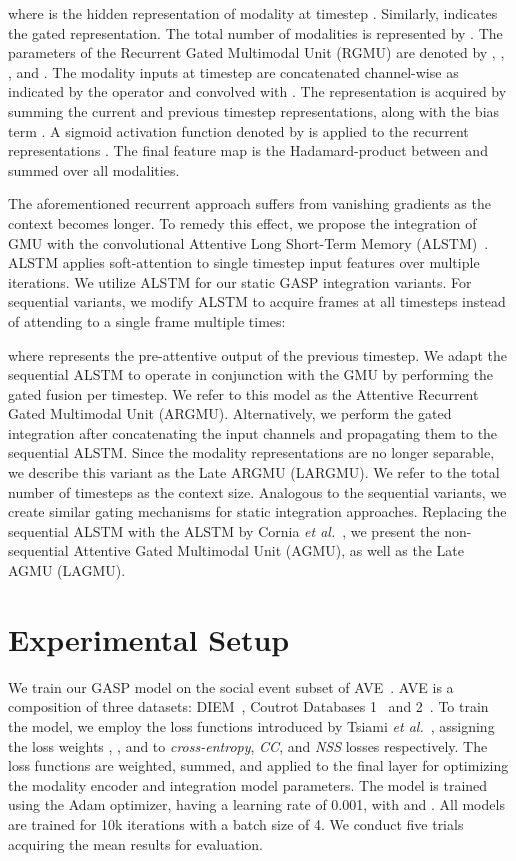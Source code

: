 \documentclass{article}
\begin{document}
where  is the hidden representation of modality  at timestep . Similarly,  indicates the gated representation. The total number of modalities is represented by . The parameters of the Recurrent Gated Multimodal Unit (RGMU) are denoted by , , , and . The modality inputs  at timestep  are concatenated channel-wise as indicated by the  operator and convolved with . The  representation is acquired by summing the current and previous timestep representations, along with the bias term . A sigmoid activation function denoted by  is applied to the recurrent representations . The final feature map  is the Hadamard-product between  and  summed over all modalities. 

The aforementioned recurrent approach suffers from vanishing gradients as the context becomes longer. To remedy this effect, we propose the integration of GMU with the convolutional Attentive Long Short-Term Memory (ALSTM)~\cite{cornia2018predicting}. 
ALSTM applies soft-attention to single timestep input features over multiple iterations.
We utilize ALSTM for our static GASP integration variants. For sequential variants, we  modify ALSTM to acquire frames at all timesteps instead of attending to a single frame multiple times:

where  represents the pre-attentive output of the previous timestep. We adapt the sequential ALSTM to operate in conjunction with the GMU by performing the gated fusion per timestep. We refer to this model as the Attentive Recurrent Gated Multimodal Unit (ARGMU). Alternatively, we perform the gated integration after concatenating the input channels and propagating them to the sequential ALSTM. Since the modality representations are no longer separable, we describe this variant as the Late ARGMU (LARGMU). We refer to the total number of timesteps as the context size. Analogous to the sequential variants, we create similar gating mechanisms for static integration approaches. Replacing the sequential ALSTM with the ALSTM by Cornia \textit{et al.}~, we present the non-sequential Attentive Gated Multimodal Unit (AGMU), as well as the Late AGMU (LAGMU).

\section{Experimental Setup}
\label{sec:exp}

We train our GASP model on the social event subset of AVE~\cite{tavakoli2020deep}. AVE is a composition of three datasets: DIEM~\cite{mital2011clustering}, Coutrot Databases 1~\cite{coutrot2014audiovisual} and 2~\cite{coutrot2015efficient}.
To train the model, we employ the loss functions introduced by Tsiami \textit{et al.}~, assigning the loss weights , , and  to \textit{cross-entropy}, \textit{CC}, and \textit{NSS} losses respectively. The loss functions  are weighted, summed, and applied to the final layer for optimizing the modality encoder and integration model parameters. 
The model is trained using the Adam optimizer, having a learning rate of 0.001, with  and . 
All models are trained for 10k iterations with a batch size of 4. We conduct five trials acquiring the mean results for evaluation.
\end{document}
